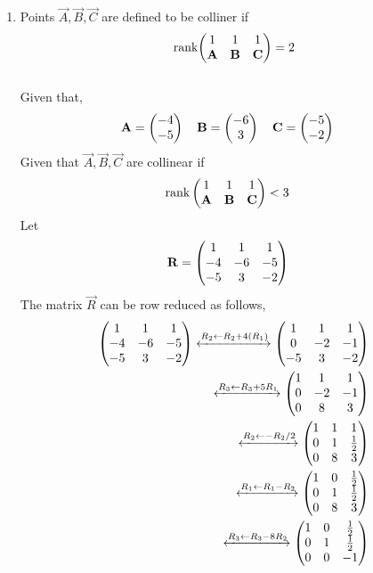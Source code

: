 \documentclass[11pt]{book}
\begin{document}
\begin{enumerate}[label=\thesection.\arabic*.,ref=\thesection.\theenumi]
\item Points $\vec{A}, \vec{B}, \vec{C}$ are defined to be colliner if
	\begin{align}
		\text{rank}{\ensuremath{\begin{pmatrix}1 & 1 & 1 \\ \mathbf{A} & \mathbf{B} & \mathbf{C}\end{pmatrix}}} = 2
	\end{align}
\solution\\
Given that,
\begin{align}
    \mathbf{A} = \begin{pmatrix}-4\\-5\end{pmatrix}
    \quad
    \mathbf{B} &= \begin{pmatrix}-6\\ 3\end{pmatrix}
    \quad
    \mathbf{C} = \begin{pmatrix}-5\\-2\end{pmatrix}
\end{align}
Given that $\vec{A},\vec{B},\vec{C}$ are collinear if
\begin{align}
    \text{rank}\myvec{
    1 & 1 & 1\\
    \vec{A} & \vec{B} & \vec{C} \\
    } &< 3 
    \label{eq:1.1.3,2}
\end{align} 
Let
\begin{align}
    \mathbf{R}&=\begin{pmatrix}
    1 & 1 & 1
    \\
    -4 & -6 & -5
    \\
    -5 & 3 & -2
    \end{pmatrix} 
\end{align} 
The matrix $\vec{R}$ can be row reduced as follows,
\begin{align}
    \label{eq:matthrowoperations}
    \myvec{
    1 & 1 & 1
    \\
   -4 & -6 & -5
    \\
    -5 & 3 & -2
    }
	\xleftrightarrow[]{R_2 \leftarrow R_2+4(R_1)}
    \myvec{
    1 & 1 & 1
    \\
    0 & -2 & -1
    \\
    -5 & 3 & -2
    }
    \\
     \xleftrightarrow[]{R_3\leftarrow R_3+5R_1}
    \myvec{
    1 & 1 & 1
    \\
    0 & -2 & -1
    \\
    0 & 8 & 3
    }
    \\
     \xleftrightarrow[]{R_2\leftarrow -R_2/2}
    \myvec{
    1 & 1 & 1
    \\
    0 & 1 & \frac{1}{2}
    \\
    0 & 8 & 3
    }
    \\
     \xleftrightarrow[]{R_1\leftarrow R_1-R_2}
    \myvec{
    1 & 0 & \frac{1}{2}
    \\
     0 & 1 & \frac{1}{2}
    \\
    0 & 8 & 3
    }
    \\
     \xleftrightarrow[]{R_3\leftarrow R_3-8R_2}
    \myvec{
    1 & 0 & \frac{1}{2}
    \\
     0 & 1 & \frac{1}{2}
    \\
    0 & 0 & -1
    }
\end{align}


\end{enumerate}
\end{document}
